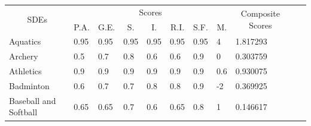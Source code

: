 \documentclass[a4paper]{article}
\begin{document}
\begin{table}[h]
    \begin{tabular}{|l|lllllll|l|ll}
    \cline{1-9}
    \multicolumn{1}{|c|}{\multirow{2}{*}{SDEs}} & \multicolumn{7}{c|}{Scores}                                                                                                                                                                                 & \multicolumn{1}{c|}{\multirow{2}{*}{Composite Scores}} &  &  \\ \cline{2-8}
    \multicolumn{1}{|c|}{}                      & \multicolumn{1}{c|}{P.A.}     & \multicolumn{1}{c|}{G.E.}     & \multicolumn{1}{c|}{S.}   & \multicolumn{1}{c|}{I.}   & \multicolumn{1}{c|}{R.I.} & \multicolumn{1}{c|}{S.F.}     & \multicolumn{1}{c|}{M.} & \multicolumn{1}{c|}{}                                  &  &  \\ \cline{1-9}
    Aquatics                                    & \multicolumn{1}{l|}{0.95}     & \multicolumn{1}{l|}{0.95}     & \multicolumn{1}{l|}{0.95} & \multicolumn{1}{l|}{0.95} & \multicolumn{1}{l|}{0.95} & \multicolumn{1}{l|}{0.95}     & 4                       & 1.817293                                               &  &  \\ \cline{1-9}
    Archery                                     & \multicolumn{1}{l|}{0.5}      & \multicolumn{1}{l|}{0.7}      & \multicolumn{1}{l|}{0.8}  & \multicolumn{1}{l|}{0.6}  & \multicolumn{1}{l|}{0.6}  & \multicolumn{1}{l|}{0.9}      & 0                       & 0.303759                                               &  &  \\ \cline{1-9}
    Athletics                                   & \multicolumn{1}{l|}{0.9}      & \multicolumn{1}{l|}{0.9}      & \multicolumn{1}{l|}{0.9}  & \multicolumn{1}{l|}{0.9}  & \multicolumn{1}{l|}{0.9}  & \multicolumn{1}{l|}{0.9}      & 0.6                     & 0.930075                                               &  &  \\ \cline{1-9}
    Badminton                                   & \multicolumn{1}{l|}{0.6}      & \multicolumn{1}{l|}{0.7}      & \multicolumn{1}{l|}{0.7}  & \multicolumn{1}{l|}{0.8}  & \multicolumn{1}{l|}{0.8}  & \multicolumn{1}{l|}{0.9}      & -2                      & 0.369925                                               &  &  \\ \cline{1-9}
    Baseball and Softball                       & \multicolumn{1}{l|}{0.65}     & \multicolumn{1}{l|}{0.65}     & \multicolumn{1}{l|}{0.7}  & \multicolumn{1}{l|}{0.6}  & \multicolumn{1}{l|}{0.65} & \multicolumn{1}{l|}{0.8}      & 1                       & 0.146617                                               &  &  \\ \cline{1-9}

\end{tabular}
\end{table}
\end{document}

